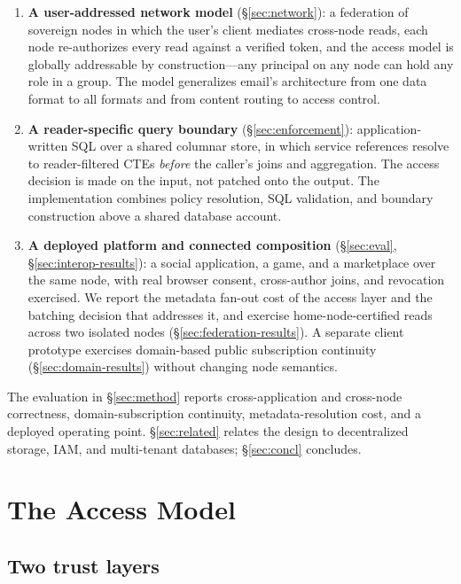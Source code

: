 \documentclass[sigconf, nonacm]{acmart}
\begin{document}
\begin{enumerate}[leftmargin=*,nosep]
  \item \textbf{A user-addressed network model}
  (\S\ref{sec:network}): a federation of sovereign nodes in which the user's
  client mediates cross-node reads, each node re-authorizes every read against
  a verified token, and the access model is globally addressable by
  construction---any principal on any node can hold any role in a group. The
  model generalizes email's architecture from one data format to all formats
  and from content routing to access control.
  \item \textbf{A reader-specific query boundary}
  (\S\ref{sec:enforcement}): application-written SQL over a shared columnar
  store, in which service references resolve to reader-filtered CTEs \emph{before}
  the caller's joins and aggregation. The access decision is made on the input,
  not patched onto the output. The implementation combines policy resolution,
  SQL validation, and boundary construction above a shared database account.
  \item \textbf{A deployed platform and connected composition}
  (\S\ref{sec:eval}, \S\ref{sec:interop-results}): a social application, a game,
  and a marketplace over the same node, with real browser consent, cross-author
  joins, and revocation exercised. We report the metadata fan-out cost of the
  access layer and the batching decision that addresses it, and exercise
  home-node-certified reads across two isolated nodes
  (\S\ref{sec:federation-results}).
  A separate client prototype exercises domain-based public subscription
  continuity (\S\ref{sec:domain-results}) without changing node semantics.
\end{enumerate}

The evaluation in \S\ref{sec:method} reports cross-application and cross-node
correctness, domain-subscription continuity, metadata-resolution cost, and a
deployed operating point. \S\ref{sec:related} relates the
design to decentralized storage, IAM, and multi-tenant databases;
\S\ref{sec:concl} concludes.

\section{The Access Model}
\label{sec:model}

\subsection{Two trust layers}
\end{document}
